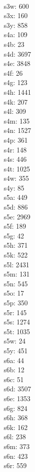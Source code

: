 \begin{multicols}{8}
  \\ s3w: 600
  \\ s3x: 160
  \\ s3y: 858
  \\ s4a: 109
  \\ s4b: 23
  \\ s4d: 3697
  \\ s4e: 3848
  \\ s4f: 26
  \\ s4g: 123
  \\ s4h: 1441
  \\ s4k: 207
  \\ s4l: 309
  \\ s4m: 135
  \\ s4n: 1527
  \\ s4p: 361
  \\ s4r: 148
  \\ s4s: 446
  \\ s4t: 1025
  \\ s4w: 355
  \\ s4y: 85
  \\ s5a: 449
  \\ s5d: 886
  \\ s5e: 2969
  \\ s5f: 189
  \\ s5g: 42
  \\ s5h: 371
  \\ s5k: 522
  \\ s5l: 2431
  \\ s5m: 131
  \\ s5n: 545
  \\ s5o: 17
  \\ s5p: 350
  \\ s5r: 145
  \\ s5s: 1274
  \\ s5t: 1035
  \\ s5w: 24
  \\ s5y: 451
  \\ s6a: 44
  \\ s6b: 12
  \\ s6c: 51
  \\ s6d: 3507
  \\ s6e: 1353
  \\ s6g: 824
  \\ s6h: 368
  \\ s6k: 162
  \\ s6l: 238
  \\ s6m: 373
  \\ s6n: 423
  \\ s6r: 559

\end{multicols}
